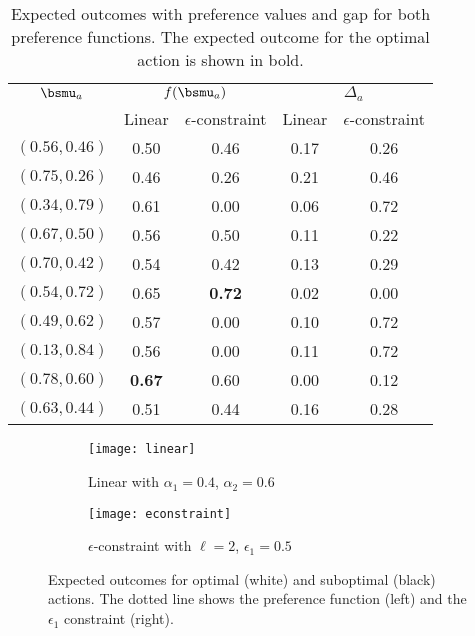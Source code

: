 \begin{table}[t]
    \centering
    \caption{Expected outcomes with preference values and gap for both preference functions. The expected outcome for the optimal action is shown in bold.}
    \begin{tabular}{ccccc}
        \hline
        $\bsmu_a$ & \multicolumn{2}{c}{$f(\bsmu_a)$} & \multicolumn{2}{c}{$\Delta_a$} \\
        & Linear & $\epsilon$-constraint & Linear & $\epsilon$-constraint \\
        \hline
        $(0.56, 0.46)$ & 0.50 & 0.46 & 0.17 & 0.26 \\
        $(0.75, 0.26)$ & 0.46 & 0.26 & 0.21 & 0.46 \\
        $(0.34, 0.79)$ & 0.61 & 0.00 & 0.06 & 0.72 \\
        $(0.67, 0.50)$ & 0.56 & 0.50 & 0.11 & 0.22 \\
        $(0.70, 0.42)$ & 0.54 & 0.42 & 0.13 & 0.29 \\
        $(0.54, 0.72)$ & 0.65 & \textbf{0.72} & 0.02 & 0.00 \\
        $(0.49, 0.62)$ & 0.57 & 0.00 & 0.10 & 0.72 \\
        $(0.13, 0.84)$ & 0.56 & 0.00 & 0.11 & 0.72 \\
        $(0.78, 0.60)$ & \textbf{0.67} & 0.60 & 0.00 & 0.12 \\
        $(0.63, 0.44)$ & 0.51 & 0.44 & 0.16 & 0.28 \\
        \hline
    \end{tabular}
\label{tab:experiments:setting}
\end{table}

\begin{figure}[t]
    \centering
    \begin{subfigure}[b]{0.41\textwidth}
        \centering
        \texttt{[image: linear]}
        \caption{Linear with $\alpha_1 = 0.4$, $\alpha_2 = 0.6$}
        \label{fig:experiments:setting:linear}
    \end{subfigure}
    \qquad
    \begin{subfigure}[b]{0.41\textwidth}
        \centering
        \texttt{[image: econstraint]}
        \caption{$\epsilon$-constraint with $\ell = 2$, $\epsilon_1 = 0.5$}
        \label{fig:experiments:setting:econstraint}
    \end{subfigure}
    \caption{Expected outcomes for optimal (white) and suboptimal (black) actions. The dotted line shows the preference function (left) and the $\epsilon_1$ constraint (right).}
\label{fig:experiments:setting}
\end{figure}

